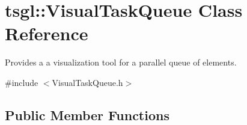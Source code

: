 \hypertarget{classtsgl_1_1_visual_task_queue}{\section{tsgl\-:\-:\-Visual\-Task\-Queue \-Class \-Reference}
\label{classtsgl_1_1_visual_task_queue}
}


\-Provides a a visualization tool for a parallel queue of elements.  




{\ttfamily \#include $<$\-Visual\-Task\-Queue.\-h$>$}

\subsection*{\-Public \-Member \-Functions}
